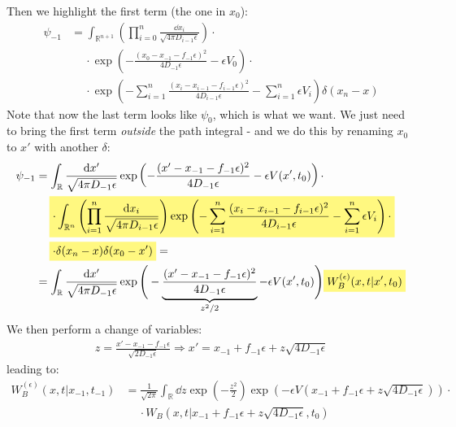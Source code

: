 \documentclass[../template.tex]{subfiles}
\begin{document}
\begin{exo}
    Then we highlight the first term (the one in $x_0$):
    \begin{align*}
        \psi_{-1} &= \int_{\mathbb{R}^{n+1}} \left(\prod_{i=0}^n \frac{\dd{x_i}}{\sqrt{4 \pi D_{i-1} \epsilon}} \right) \cdot\\
        &\quad \> \cdot \exp\left(-\frac{(x_0 - x_{-1} - f_{-1}\epsilon)^2}{4 D_{-1} \epsilon} - \epsilon V_0 \right) \cdot\\
        &\quad \> \cdot \exp\left(-\sum_{i=1}^n\frac{(x_i - x_{i-1} - f_{i-1} \epsilon)^2}{4 D_{i-1} \epsilon}  - \sum_{i=1}^n\epsilon V_i\right) \delta(x_n - x)
    \end{align*}
    Note that now the last term looks like $\psi_0$, which is what we want. We just need to bring the first term \textit{outside} the path integral - and we do this by renaming $x_0$ to $x'$ with another $\delta$:
    \begin{align*}
        \psi_{-1} &= \int_{\mathbb{R}} \frac{\dd{x'}}{\sqrt{4 \pi D_{-1} \epsilon}} \exp\left(-\frac{(x'- x_{-1} - f_{-1}\epsilon)^2}{4 D_{-1} \epsilon} - \epsilon V(x',t_0) \right) \cdot\\
        &\quad \> \hlc{Yellow}{\cdot \int_{\mathbb{R}^n} \left(\prod_{i=1}^n \frac{\dd{x_i}}{\sqrt{4 \pi D_{i-1}\epsilon}} \right) \exp\left(-\sum_{i=1}^n\frac{(x_i - x_{i-1} - f_{i-1} \epsilon)^2}{4 D_{i-1} \epsilon}  - \sum_{i=1}^n\epsilon V_i\right)\cdot}\\
        &\quad \> \hlc{Yellow}{\cdot \delta(x_n - x) \delta(x_0 - x') }=\\
        &= \int_{\mathbb{R}} \frac{\dd{x'}}{\sqrt{4 \pi D_{-1} \epsilon}} \exp\Bigg(-\underbrace{\frac{(x'- x_{-1} - f_{-1}\epsilon)^2}{4 D_{-1} \epsilon}}_{z^2/2} - \epsilon V(x',t_0) \Bigg) \hlc{Yellow}{W_B^{(\epsilon)}(x,t|x',t_0)}
    \end{align*} 
    We then perform a change of variables:
    \begin{align*}
        z = \frac{x'-x_{-1}-f_{-1}\epsilon}{\sqrt{2 D_{-1}\epsilon}}  \Rightarrow x' = x_{-1} + f_{-1} \epsilon + z \sqrt{4 D_{-1}\epsilon}
    \end{align*}
    leading to:
    \begin{align*}
        W_B^{(\epsilon)}(x,t|x_{-1},t_{-1}) &= \frac{1}{\sqrt{2 \pi}} \int_{\mathbb{R}} \dd{z} \exp\left(-\frac{z^2}{2} \right)\exp\left(-\epsilon V(x_{-1}+f_{-1}\epsilon + z\sqrt{4 D_{-1}\epsilon})\right) \cdot\\
        &\quad \> \cdot W_B(x,t|x_{-1}+f_{-1}\epsilon + z \sqrt{4 D_{-1}\epsilon},t_0)
    \end{align*}

\end{exo}
\end{document}
